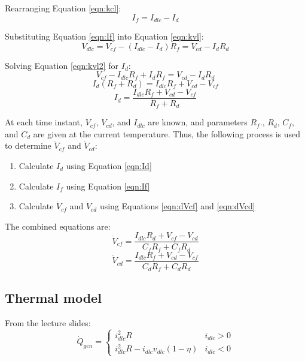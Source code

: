 \documentclass[fleqn]{article}
\begin{document}
Rearranging Equation \ref{eqn:kcl}:
\begin{equation}
I_f = I_{dlc} - I_d
\label{eqn:If}
\end{equation}

Substituting Equation \ref{eqn:If} into Equation \ref{eqn:kvl}:
\begin{equation}
V_{dlc} = V_{cf} - \left(I_{dlc} - I_d\right) R_f = V_{cd} - I_d R_d
\label{eqn:kvl2}
\end{equation}

Solving Equation \ref{eqn:kvl2} for $I_d$:
\begin{equation}
V_{cf} - I_{dlc} R_f + I_d R_f = V_{cd} - I_d R_d
\end{equation}
\begin{equation}
I_d \left(R_f + R_d\right) = I_{dlc} R_f + V_{cd} - V_{cf}
\end{equation}
\begin{equation}
I_d = \frac{I_{dlc} R_f + V_{cd} - V_{cf}}{R_f + R_d}
\label{eqn:Id}
\end{equation}

At each time instant, $V_{cf}$, $V_{cd}$, and $I_{dlc}$ are known, and parameters $R_f.$, $R_d$, $C_f$, and $C_d$ are given at the current temperature.  Thus, the following process is used to determine $\dot{V}_{cf}$ and $\dot{V}_{cd}$:
\begin{enumerate}
\item Calculate $I_d$ using Equation \ref{eqn:Id}
\item Calculate $I_f$ using Equation \ref{eqn:If}
\item Calculate $\dot{V}_{cf}$ and $\dot{V}_{cd}$ using Equations \ref{eqn:dVcf} and \ref{eqn:dVcd}
\end{enumerate}

The combined equations are:
\begin{equation}
\dot{V}_{cf} = \frac{I_{dlc} R_d + V_{cf} - V_{cd}}{C_f R_f + C_f R_d}
\label{eqn:dVcf2}
\end{equation}
\begin{equation}
\dot{V}_{cd} = \frac{I_{dlc} R_f + V_{cd} - V_{cf}}{C_d R_f + C_d R_d}
\label{eqn:dVcd2}
\end{equation}

\subsection{Thermal model}

From the lecture slides:
\begin{equation}
\dot{Q}_{gen} = 
\begin{cases}
i_{dlc}^2 R & i_{dlc} > 0 \\
i_{dlc}^2 R - i_{dlc} v_{dlc} \left(1 - \eta\right) & i_{dlc} < 0
\end{cases}
\label{eqn:qgen}
\end{equation}
\end{document}
